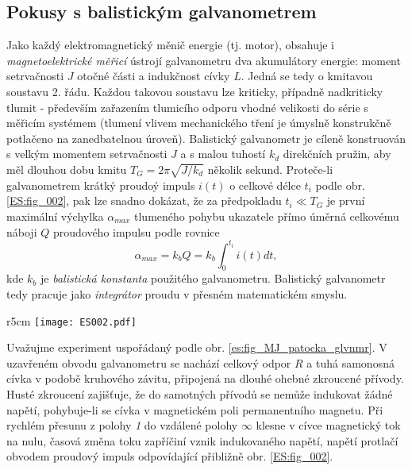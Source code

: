     \subsection{Pokusy s balistickým galvanometrem}
      Jako každý elektromagnetický měnič energie (tj. motor), obsahuje i \emph{magnetoelektrické
      měřicí} ústrojí galvanometru dva akumulátory energie: moment setrvačnosti \(J\) otoč\-né 
      části a indukčnost cívky \(L\). Jedná se tedy o kmitavou soustavu 2. řádu. Každou takovou 
      soustavu lze kriticky, případně nadkriticky tlumit - především zařazením tlumicího odporu 
      vhodné velikosti do série s měřicím systémem (tlumení vlivem mechanického tření je úmyslně 
      konstrukčně potlačeno na zanedbatelnou úroveň). Balistický galvanometr je cíleně konstruován 
      s velkým momentem setrvačnosti \(J\) a s malou tuhostí \(k_d\) direkčních pružin, aby měl 
      dlouhou dobu kmitu \(T_G = 2\pi\sqrt{J/k_d}\) několik sekund. Proteče-li galvanometrem krátký 
      proudoý impuls \(i(t)\) o celkové délce \(t_i\) podle obr. \ref{ES:fig_002}, pak lze snadno 
      dokázat, že za předpokladu \(t_i\ll T_G\) je první maximální výchylka \(\alpha_{max}\) 
      tlumeného pohybu ukazatele přímo úměrná celkovému náboji \(Q\) proudového impulsu podle 
      rovnice 
      \begin{equation}\label{ES:eq_zakl_elm01}
        \alpha_{max} = k_b Q = k_b\int_0^{t_i} i(t)dt,
      \end{equation}
      kde \(k_b\) je \emph{balistická konstanta} použitého galvanometru. Balistický galvanometr tedy
      pracuje jako \emph{integrátor} proudu v přesném matematickém smyslu. 
      
      \begin{wrapfigure}[12]{r}{5cm}   %
        \centering
        \texttt{[image: ES002.pdf]}
        \caption{Příklad krátkého proudového impulsu prošlého balistickým galvanometrem.}
        \label{ES:fig_002}
      \end{wrapfigure}    
      Uvažujme experiment uspořádaný podle obr. \ref{es:fig_MJ_patocka_glvnmr}. V uzavřeném obvodu
      galvanometru se nachází celkový odpor \(R\) a tuhá samonosná cívka v podobě kruhového závitu,
      připojená na dlouhé ohebné zkroucené přívody. Husté zkroucení zajišťuje, že do samotných
      přívodů se nemůže indukovat žádné napětí, pohybuje-li se cívka v magnetickém poli 
      permanentního magnetu. Při rychlém přesunu z polohy \emph{1} do vzdálené polohy \(\infty\) 
      klesne v cívce magnetický tok na nulu, časová změna toku zapříčiní vznik indukovaného napětí, 
      napětí protlačí obvodem proudový impuls odpovídající přibližně obr. \ref{ES:fig_002}.
  
